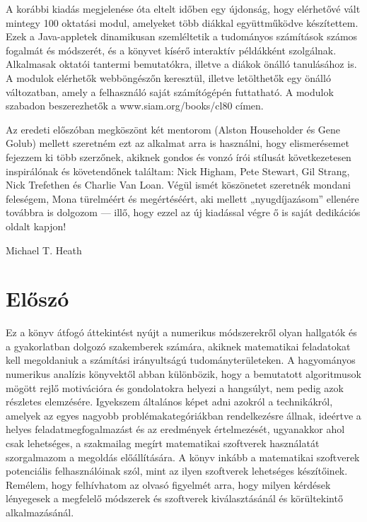 \documentclass[
  magyar,
  11pt]{article}
\begin{document}
A korábbi kiadás megjelenése óta eltelt időben egy újdonság, hogy
elérhetővé vált mintegy 100 oktatási modul, amelyeket több diákkal
együttműködve készítettem. Ezek a Java-appletek dinamikusan szemléltetik
a tudományos számítások számos fogalmát és módszerét, és a könyvet
kísérő interaktív példákként szolgálnak. Alkalmasak oktatói tantermi
bemutatókra, illetve a diákok önálló tanulásához is. A modulok elérhetők
webböngészőn keresztül, illetve letölthetők egy önálló változatban,
amely a felhasználó saját számítógépén futtatható. A modulok szabadon
beszerezhetők a www.siam.org/books/cl80 címen.

Az eredeti előszóban megköszönt két mentorom (Alston Householder és Gene
Golub) mellett szeretném ezt az alkalmat arra is használni, hogy
elismerésemet fejezzem ki több szerzőnek, akiknek gondos és vonzó írói
stílusát következetesen inspirálónak és követendőnek találtam: Nick
Higham, Pete Stewart, Gil Strang, Nick Trefethen és Charlie Van Loan.
Végül ismét köszönetet szeretnék mondani feleségem, Mona türelméért és
megértéséért, aki mellett „nyugdíjazásom'' ellenére továbbra is dolgozom
--- illő, hogy ezzel az új kiadással végre ő is saját dedikációs oldalt
kapjon!

Michael T. Heath

\section{Előszó}\label{elux151szuxf3}

Ez a könyv átfogó áttekintést nyújt a numerikus módszerekről olyan
hallgatók és a gyakorlatban dolgozó szakemberek számára, akiknek
matematikai feladatokat kell megoldaniuk a számítási irányultságú
tudományterületeken. A hagyományos numerikus analízis könyvektől abban
különbözik, hogy a bemutatott algoritmusok mögött rejlő motivációra és
gondolatokra helyezi a hangsúlyt, nem pedig azok részletes elemzésére.
Igyekszem általános képet adni azokról a technikákról, amelyek az egyes
nagyobb problémakategóriákban rendelkezésre állnak, ideértve a helyes
feladatmegfogalmazást és az eredmények értelmezését, ugyanakkor ahol
csak lehetséges, a szakmailag megírt matematikai szoftverek használatát
szorgalmazom a megoldás előállítására. A könyv inkább a matematikai
szoftverek potenciális felhasználóinak szól, mint az ilyen szoftverek
lehetséges készítőinek. Remélem, hogy felhívhatom az olvasó figyelmét
arra, hogy milyen kérdések lényegesek a megfelelő módszerek és
szoftverek kiválasztásánál és körültekintő alkalmazásánál.
\end{document}
